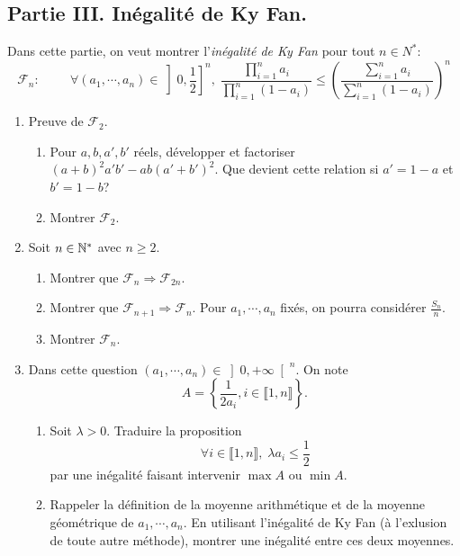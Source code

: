 \subsection*{Partie III. Inégalité de Ky Fan.}
Dans cette partie, on veut montrer l'\emph{inégalité de Ky Fan} pour tout $n\in N^*$:
\[
 \mathcal{F}_n:\hspace{1cm} \forall (a_1,\cdots, a_n)\in \left] 0, \frac{1}{2}\right]^n,\;
 \frac{\prod_{i=1}^n a_i}{\prod_{i=1}^n (1-a_i)} \leq 
 \left( \frac{\sum_{i=1}^n a_i}{\sum_{i=1}^n (1 - a_i)}\right)^n 
\]
\begin{enumerate}
 \item Preuve de $\mathcal{F}_2$.
 \begin{enumerate}
  \item Pour $a, b, a', b'$ réels, développer et factoriser $(a+b)^2a'b' - ab(a'+b')^2$.\newline 
Que devient cette relation si $a' = 1-a$ et $b' = 1-b$?
  \item Montrer $\mathcal{F}_2$.
 \end{enumerate}

  \item Soit $n\in \mathbb{N}^*$ avec $n\geq 2$.
  \begin{enumerate}
   \item Montrer que $\mathcal{F}_n \Rightarrow \mathcal{F}_{2n}$.
   \item Montrer que $\mathcal{F}_{n+1} \Rightarrow \mathcal{F}_{n}$. Pour $a_1, \cdots, a_n$ fixés, on pourra considérer $\frac{S_n}{n}$.
   \item Montrer $\mathcal{F}_n$.
  \end{enumerate}
 
 \item Dans cette question $(a_1, \cdots, a_n)\in \left] 0, + \infty\right[^n$. On note 
\[
 A = \left\lbrace \frac{1}{2a_i}, i \in \llbracket 1,n \rrbracket \right\rbrace. 
\]
\begin{enumerate}
 \item Soit $\lambda > 0$. Traduire la proposition
\[
 \forall i \in \llbracket 1,n \rrbracket, \; \lambda a_i \leq \frac{1}{2}
\]
 par une inégalité faisant intervenir $\max A$ ou $\min A$.
 \item Rappeler la définition de la moyenne arithmétique et de la moyenne géométrique de $a_1, \cdots, a_n$. En utilisant l'inégalité de Ky Fan (à l'exlusion de toute autre méthode), montrer une inégalité entre ces deux moyennes.
\end{enumerate}

   
\end{enumerate}

